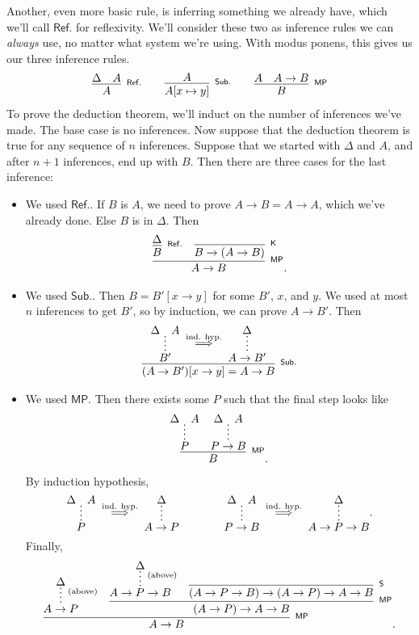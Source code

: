 \documentclass[11pt,paper=letter]{scrartcl}
\newcommand{\sf}{\mathsf}
\newcommand{\vc}[1]{\vcenter{\hbox{#1}}}
\begin{document}
Another, even more basic rule, is inferring something we already have, which we'll call $\sf{Ref.}$ for reflexivity. We'll consider these two as inference rules we can \emph{always} use, no matter what system we're using. With modus ponens, this gives us our three inference rules.
\begin{align*}
\infer[^\sf{Ref.}]
{A}
{\Delta & A}
\qquad
\infer[^\sf{Sub.}]
{A[x \mapsto y]}
{A}
\qquad
\infer[^\sf{MP}]
{B}
{A & A \to B}
\end{align*}
To prove the deduction theorem, we'll induct on the number of inferences we've made. The base case is no inferences. Now suppose that the deduction theorem is true for any sequence of $n$ inferences. Suppose that we started with $\Delta$ and $A$, and after $n+1$ inferences, end up with $B$. Then there are three cases for the last inference:
\begin{itemize}
\item We used $\sf{Ref.}$. If $B$ is $A$, we need to prove $A \to B = A \to A$, which we've already done. Else $B$ is in $\Delta$. Then
\begin{align*}
\infer[^\sf{MP}]
{A \to B}
{
\infer[^\sf{Ref.}]
{B}
{\Delta}
&
\infer[^\sf{K}]
{B \to (A \to B)}
{}
}.
\end{align*}
\item We used $\sf{Sub.}$. Then $B = B'[x \to y]$ for some $B'$, $x$, and $y$. We used at most $n$ inferences to get $B'$, so by induction, we can prove $A \to B'$. Then
\begin{align*}
\infer[^\sf{Sub.}]
{(A \to B')[x \to y] = A \to B}
{
\vc{\infer*
{B'}
{\Delta & A}}
\;\overset{\text{ind. hyp.}}{\implies}\;
\vc{\infer*
{A \to B'}
{\Delta}}
}
\end{align*}
\item We used $\sf{MP}$. Then there exists some $P$ such that the final step looks like
\begin{align*}
\infer[^\sf{MP}]
{B}
{
\infer*
{P}
{\Delta & A}
&
\infer*
{P \to B}
{\Delta & A}
}.
\end{align*}
By induction hypothesis,
\begin{align*}
\vc{\infer*
{P}
{\Delta & A}}
\;\overset{\text{ind. hyp.}}{\implies}\;
\vc{\infer*
{A \to P}
{\Delta}}
\qquad\qquad
\vc{\infer*
{P \to B}
{\Delta & A}}
\;\overset{\text{ind. hyp.}}{\implies}\;
\vc{\infer*
{A \to P \to B}
{\Delta}}.
\end{align*}
Finally,
\begin{align*}
\infer[^\sf{MP}]
{A \to B}
{
\infer*[^\text{(above)}]{A \to P}{\Delta}
&
\infer[^\sf{MP}]{(A \to P) \to A \to B}{
\infer*[^\text{(above)}]{A \to P \to B}{\Delta}
&
\infer[^\sf{S}]{(A \to P \to B) \to (A \to P) \to A \to B}{}
}
}.
\end{align*}
\end{itemize}
\end{document}
